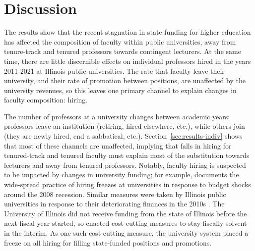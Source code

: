 \section{Discussion}

The results show that the recent stagnation in state funding for higher education has affected the composition of faculty within public universities, away from tenure-track and tenured professors towards contingent lecturers.
At the same time, there are little discernible effects on individual professors hired in the years 2011-2021 at Illinois public universities.
The rate that faculty leave their university, and their rate of promotion between positions, are unaffected by the university revenues, so this leaves one primary channel to explain changes in faculty composition: hiring.

The number of professors at a university changes between academic years: professors leave an institution (retiring, hired elsewhere, etc.), while others join (they are newly hired, end a sabbatical, etc.).
Section~\ref{sec:results-indiv} shows that most of these channels are unaffected, implying that falls in hiring for tenured-track and tenured faculty must explain most of the substitution towards lecturers and away from tenured professors.
Notably, faculty hiring is suspected to be impacted by changes in university funding; for example, \cite{turner2014impact} documents the wide-spread practice of hiring freezes at universities in response to budget shocks around the 2008 recession.
Similar measures were taken by Illinois public universities in response to their deteriorating finances in the 2010s \citep{furlough2010}.
The University of Illinois did not receive funding from the state of Illinois before the next fiscal year started, so enacted cost-cutting measures to stay fiscally solvent in the interim.
As one such cost-cutting measure, the university system placed a freeze on all hiring for filling state-funded positions and promotions.

